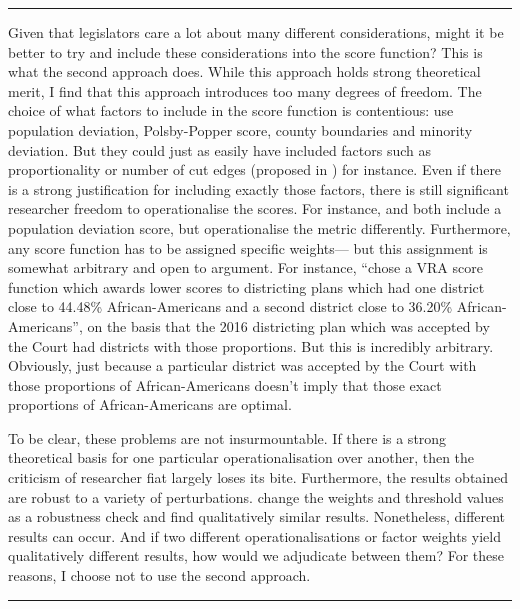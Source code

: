 \documentclass[]{article}
\begin{document}
\begin{center}\rule{0.5\linewidth}{\linethickness}\end{center}

Given that legislators care a lot about many different considerations,
might it be better to try and include these considerations into the
score function? This is what the second approach does. While this
approach holds strong theoretical merit, I find that this approach
introduces too many degrees of freedom. The choice of what factors to
include in the score function is contentious: \citeauthor{h2018} use
population deviation, Polsby-Popper score, county boundaries and
minority deviation. But they could just as easily have included factors
such as proportionality or number of cut edges (proposed in
\cite{dc2016}) for instance. Even if there is a strong justification for
including exactly those factors, there is still significant researcher
freedom to operationalise the scores. For instance, \citeauthor{h2018}
and \citeauthor{dd2019va} both include a population deviation score, but
operationalise the metric differently. Furthermore, any score function
has to be assigned specific weights--- but this assignment is somewhat
arbitrary and open to argument. For instance, \citeauthor{h2018} ``chose
a VRA score function which awards lower scores to districting plans
which had one district close to 44.48\% African-Americans and a second
district close to 36.20\% African-Americans'', on the basis that the
2016 districting plan which was accepted by the Court had districts with
those proportions. But this is incredibly arbitrary. Obviously, just
because a particular district was accepted by the Court with those
proportions of African-Americans doesn't imply that those exact
proportions of African-Americans are optimal.

To be clear, these problems are not insurmountable. If there is a strong
theoretical basis for one particular operationalisation over another,
then the criticism of researcher fiat largely loses its bite.
Furthermore, the results obtained are robust to a variety of
perturbations. \cite{h2018} change the weights and threshold values as a
robustness check and find qualitatively similar results. Nonetheless,
different results can occur. And if two different operationalisations or
factor weights yield qualitatively different results, how would we
adjudicate between them? For these reasons, I choose not to use the
second approach.

\begin{center}\rule{0.5\linewidth}{\linethickness}\end{center}
\end{document}

